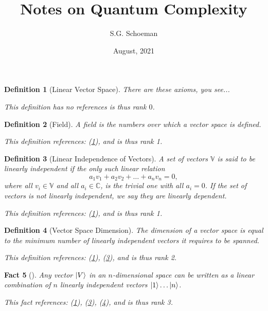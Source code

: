 \documentclass{article}
\title{Notes on Quantum Complexity}
\author{S.G. Schoeman}
\date{August, 2021}
\newtheorem{definition}{Definition}
\newtheorem{fact}[definition]{Fact}
\newtheorem{External Info}[definition]{External Info}
\begin{document}
\maketitle

\begin{tcolorbox}[title=Definition: Linear Vector Space]\begin{definition}[Linear Vector Space]\label{0}There are these axioms, you see... 
 
 This definition has no references is thus rank $0$.\end{definition}\end{tcolorbox}
\begin{tcolorbox}[title=Definition: Field]\begin{definition}[Field]\label{1}A field is the numbers over which a vector space is defined.
 
 This definition references: (\ref{0}), and is thus rank 1.\end{definition}\end{tcolorbox}
\begin{tcolorbox}[title=Definition: Linear Independence of Vectors]\begin{definition}[Linear Independence of Vectors]\label{2}A set of vectors $\mathbb{V}$ is said to be linearly independent if the only such
linear relation $$a_1v_1+a_2v_2+\ldots+a_nv_n=0,$$ where all $v_i\in\mathbb{V}$ and all
$a_i\in\mathbb{C}$, is the trivial one with all $a_i = 0$. If the set of vectors
is not linearly independent, we say they are linearly dependent. 
 
 This definition references: (\ref{0}), and is thus rank 1.\end{definition}\end{tcolorbox}
\begin{tcolorbox}[title=Definition: Vector Space Dimension]\begin{definition}[Vector Space Dimension]\label{3}The dimension of a vector space is equal to the minimum number of linearly independent vectors it requires to be spanned.
 
 This definition references: (\ref{0}), (\ref{2}), and is thus rank 2.\end{definition}\end{tcolorbox}
\begin{tcolorbox}[title=Fact]\begin{fact}[]\label{4}Any vector $\ket{V}$ in an $n$-dimensional space can be written as a
linear combination of $n$ linearly independent vectors $\ket{1}\ldots\ket{n}$.
 
 This fact references: (\ref{0}), (\ref{2}), (\ref{3}), and is thus rank 3.\end{fact}\end{tcolorbox}
\end{document}
